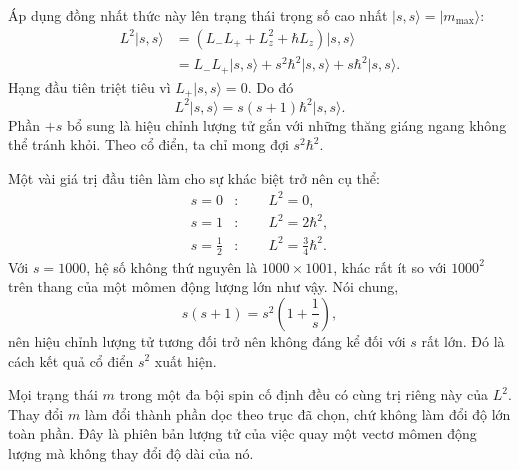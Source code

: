 Áp dụng đồng nhất thức này lên trạng thái trọng số cao nhất \(\lvert s,s\rangle=\lvert m_{\max}\rangle\):
\begin{align}
L^2\lvert s,s\rangle
&=\left(L_-L_++L_z^2+\hbar L_z\right)\lvert s,s\rangle \\
&=L_-L_+\lvert s,s\rangle
+s^2\hbar^2\lvert s,s\rangle
+s\hbar^2\lvert s,s\rangle.
\end{align}
Hạng đầu tiên triệt tiêu vì \(L_+\lvert s,s\rangle=0\). Do đó
\begin{equation}
L^2\lvert s,s\rangle
=s(s+1)\hbar^2\lvert s,s\rangle.
\end{equation}
Phần \(+s\) bổ sung là hiệu chỉnh lượng tử gắn với những thăng giáng ngang không thể tránh khỏi. Theo cổ điển, ta chỉ mong đợi \(s^2\hbar^2\).

Một vài giá trị đầu tiên làm cho sự khác biệt trở nên cụ thể:
\begin{align}
s=0 &: \qquad L^2=0,\\
s=1 &: \qquad L^2=2\hbar^2,\\
s=\frac12 &: \qquad L^2=\frac34\hbar^2.
\end{align}
Với \(s=1000\), hệ số không thứ nguyên là \(1000\times1001\), khác rất ít so với \(1000^2\) trên thang của một mômen động lượng lớn như vậy. Nói chung,
\begin{equation}
s(s+1)=s^2\left(1+\frac1s\right),
\end{equation}
nên hiệu chỉnh lượng tử tương đối trở nên không đáng kể đối với \(s\) rất lớn. Đó là cách kết quả cổ điển \(s^2\) xuất hiện.

Mọi trạng thái \(m\) trong một đa bội spin cố định đều có cùng trị riêng này của \(L^2\). Thay đổi \(m\) làm đổi thành phần dọc theo trục đã chọn, chứ không làm đổi độ lớn toàn phần. Đây là phiên bản lượng tử của việc quay một vectơ mômen động lượng mà không thay đổi độ dài của nó.

\begin{classroomqa}
\end{classroomqa}

\begin{classroomqa}
\end{classroomqa}

